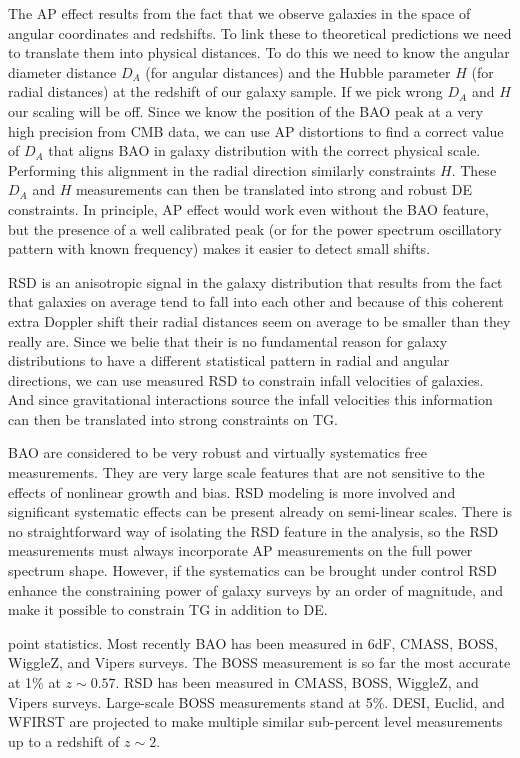 The AP effect results from the fact that we observe galaxies in the space of
angular coordinates and redshifts. To link these  to theoretical  predictions
we need to translate them into physical distances. To do this we need to know
the angular diameter distance $D_A$ (for angular distances)  and the Hubble
parameter $H$ (for radial distances) at the redshift of our galaxy sample. If
we pick wrong $D_A$ and $H$ our scaling will be off. Since we know the
position of the BAO peak at a very high precision from CMB data, we can use AP
distortions to find a correct value of $D_A$ that aligns BAO in galaxy
distribution with the correct physical scale. Performing this alignment in the
radial direction similarly constraints $H$. These $D_A$ and $H$ measurements
can then be translated into strong and robust DE constraints. In principle, AP
effect would work even without the BAO feature, but the presence of a well
calibrated peak (or for the power spectrum oscillatory pattern with known
frequency) makes it easier to detect small shifts.

RSD is an anisotropic signal in the galaxy distribution that results from the
fact that galaxies on average tend to fall into each other and because of this
coherent extra Doppler shift their radial distances seem on average to be
smaller than they really are. Since we belie that their is no fundamental
reason for galaxy distributions to have a different statistical pattern in
radial and angular directions, we can use measured RSD to constrain infall
velocities of galaxies. And since gravitational interactions source the infall
velocities this information can then be translated into strong constraints on
TG.

BAO are considered to be very robust and virtually systematics free
measurements. They are very large scale features that are not sensitive to the
effects of nonlinear growth and bias. RSD modeling is more involved and
significant systematic effects can be present already on semi-linear scales.
There is no straightforward way of isolating the RSD feature in the analysis,
so the RSD measurements must always incorporate AP measurements on the full
power spectrum shape. However, if the systematics can be brought under control
RSD enhance the constraining power of galaxy surveys by an order of magnitude,
and make it possible to constrain TG in addition to DE.

point statistics. Most recently BAO has been measured in 6dF, CMASS, BOSS,
WiggleZ, and Vipers surveys. The BOSS measurement is so far the most accurate
at 1\% at $z\sim0.57$. RSD has been measured in CMASS, BOSS, WiggleZ, and
Vipers surveys. Large-scale BOSS measurements stand at 5\%. DESI, Euclid, and
WFIRST are projected to make multiple similar sub-percent level measurements
up to a redshift of $z\sim 2$.

